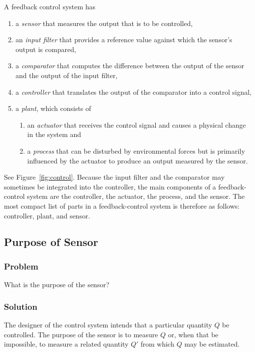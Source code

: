 A feedback control system has
\begin{enumerate}
   \item a \emph{sensor} that measures the output that is to be controlled,
   \item an \emph{input filter} that provides a reference value against which
      the sensor's output is compared,
   \item a \emph{comparator} that computes the difference between the output of
      the sensor and the output of the input filter,
   \item a \emph{controller} that translates the output of the comparator into
      a control signal,
   \item a \emph{plant}, which consists of
      \begin{enumerate}
         \item an \emph{actuator} that receives the control signal and causes a
            physical change in the system and
         \item a \emph{process} that can be disturbed by environmental forces
            but is primarily influenced by the actuator to produce an output
            measured by the sensor.
      \end{enumerate}
\end{enumerate}
See Figure~\ref{fig:control}. Because the input filter and the comparator may
sometimes be integrated into the controller, the main components of a
feedback-control system are the controller, the actuator, the process, and the
sensor. The most compact list of parts in a feedback-control system is
therefore as follows: controller, plant, and sensor.

\subsection{Purpose of Sensor}

\subsubsection{Problem}

What is the purpose of the sensor?

\subsubsection{Solution}

The designer of the control system intends that a particular quantity $Q$ be
controlled. The purpose of the sensor is to measure $Q$ or, when that be
impossible, to measure a related quantity $Q'$ from which $Q$ may be estimated.

